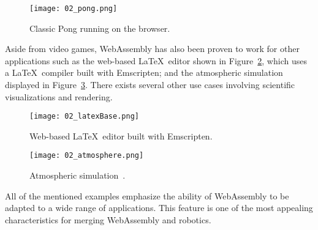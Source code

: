         \begin{figure}[htbp]
            \centering
            \texttt{[image: 02\_pong.png]}
            \caption{Classic Pong running on the browser.}
            \label{fig:pong}
        \end{figure}

        Aside from video games, WebAssembly has also been proven to work for other applications such as the web-based \LaTeX\ editor shown in Figure~\ref{fig:latex}, which uses a \LaTeX\ compiler built with Emscripten; and the atmospheric simulation displayed in Figure~\ref{fig:atmos}. There exists several other use cases involving scientific visualizations and rendering. 

        \begin{figure}[htbp]
            \centering
            \texttt{[image: 02\_latexBase.png]}
            \caption{Web-based \LaTeX\ editor built with Emscripten.}
            \label{fig:latex}
        \end{figure}



        \begin{figure}[htbp]
            \centering
            \texttt{[image: 02\_atmosphere.png]}
            \caption{Atmospheric simulation~\cite{atmos}.}
            \label{fig:atmos}
        \end{figure}

        All of the mentioned examples emphasize the ability of WebAssembly to be adapted to a wide range of applications. This feature is one of the most appealing characteristics for merging WebAssembly and robotics.


